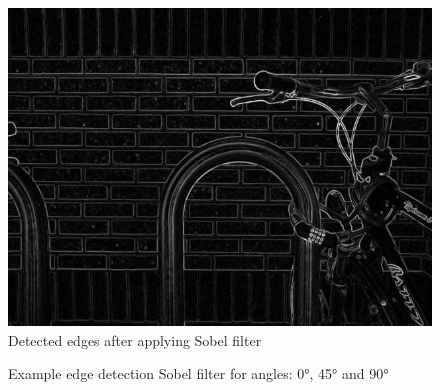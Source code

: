 \begin{figure}[!ht]
  \centering
  \includegraphics[scale=0.35]{Images/bikes-gray-sobel.jpg}
  \caption{Detected edges after applying Sobel filter\protect\footnotemark}
  \label{figurelabel}
\end{figure}



\begin{figure}[!ht]
  
  \caption{Example edge detection Sobel filter for angles: \ang{0}, \ang{45} and \ang{90}}
  \label{figurelabel}
\end{figure}  




